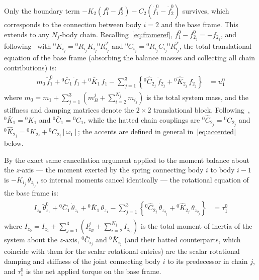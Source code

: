 Only the boundary term $- K_2(f^0_1 - f^0_2) - C_2(\dot{f}^0_1 - \dot{f}^0_2)$ survives, which corresponds to the connection between body $i = 2$ and the base frame. This extends to any $N_j$-body chain. Recalling~\eqref{eq:frameref}, $f^{0}_{1} - f^{0}_{2_j} = -f_{2_j}$, and following~\cite{Al-Rawashdeh2022_Caracterization} with ${}^0K_{i_j}={}^0R_{i_j} K_{i_j} {}^0R^T_{i_j}$ and ${}^0C_{i_j}={}^0R_{i_j} C_{i_j} {}^0R^T_{i_j}$, the total translational equation of the base frame (absorbing the balance masses and collecting all chain contributions) is:
\begin{align} \label{eq:baseframeeq}
    \begin{split}
        m_0\,\ddot{f}^{0}_{1}
        + {}^0\bar{C}_1\,\dot{f}_1
        + {}^0\bar{K}_1\,f_1
        - \sum_{j=1}^{3}\left\{
            {}^0\hat{C}_{2_j}\,\dot{f}_{2_j} + {}^0\hat{K}_{2_j}\,f_{2_j}
        \right\}
        &= u^0_{1}
    \end{split}
\end{align}
where $m_0 = m_{1} + \sum_{j=1}^{3}\!\left(m^j_{B} + \sum_{i=2}^{N_j} m_{i_j}\right)$ is the total system mass, and the stiffness and damping matrices denote the $2\times2$ translational block. Following~\cite{Al-Rawashdeh2022_Caracterization}, ${}^0\bar{K}_1 = {}^0K_1$ and ${}^0\bar{C}_1 = {}^0C_1$, while the hatted chain couplings are ${}^0\hat{C}_{2_j} = {}^0C_{2_j}$ and ${}^0\hat{K}_{2_j} = {}^0K_{2_j} + {}^0C_{2_j}[\omega_1]$; the accents are defined in general in~\eqref{eq:accented} below.

By the exact same cancellation argument applied to the moment balance about the $z$-axis — the moment exerted by the spring connecting body $i$ to body $i-1$ is $-K_{i_j}\,\theta_{z_{i_j}}$, so internal moments cancel identically — the rotational equation of the base frame is:
\begin{align} \label{eq:baseframerot}
    \begin{split}
        I_{z_0}\,\ddot{\theta}^{0}_{z_1}
        + {}^0\bar{C}_1\,\dot{\theta}_{z_1}
        + {}^0\bar{K}_1\,\theta_{z_1}
        - \sum_{j=1}^{3}\left\{
            {}^0\hat{C}_{2_j}\,\dot{\theta}_{z_{2_j}}
            + {}^0\hat{K}_{2_j}\,\theta_{z_{2_j}}
        \right\}
        &= \tau^0_{1}
    \end{split}
\end{align}
where $I_{z_0} = I_{z_1} + \sum_{j=1}^{3}\!\left(I^j_{z_B} + \sum_{i=2}^{N_j} I_{z_{i_j}}\right)$ is the total moment of inertia of the system about the $z$-axis, ${}^0\bar{C}_{i_j}$ and ${}^0\bar{K}_{i_j}$ (and their hatted counterparts, which coincide with them for the scalar rotational entries) are the scalar rotational damping and stiffness of the joint connecting body $i$ to its predecessor in chain $j$, and $\tau^0_1$ is the net applied torque on the base frame.

